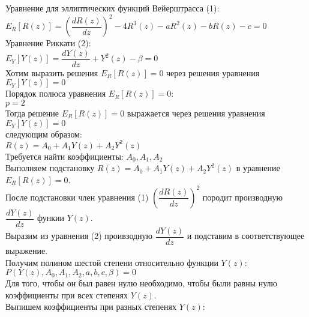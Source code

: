 \documentclass[12pt,a4paper,draft]{letter}
\begin{document}
\onehalfspacing
Уравнение для эллиптических функций Вейерштрасса (1):
\\
$E_R [R(z)] = \left(\dfrac{dR(z)}{dz}\right)^2 - 4R^3(z) - aR^2(z) - bR(z) - c = 0$
\\
Уравнение Риккати (2):
\\
$E_Y [Y(z)] = \dfrac{dY(z)}{dz} + Y^2(z) - \beta = 0$
\\
Хотим выразить решения $E_R [R(z)] = 0$ через решения уравнения $E_Y [Y(z)] = 0$
\\
Порядок полюса уравнения $E_R [R(z)] = 0$:
\\
$p = 2$
\\
Тогда решение $E_R [R(z)] = 0$ выражается через решения уравнения $E_Y [Y(z)] = 0$
\\
следующим образом:
\\
$R(z) = A_0 + A_1 Y(z) + A_2 Y^2(z)$
\\
Требуется найти коэффициенты: $A_0, A_1, A_2$
\\
Выполняем подстановку $R(z) = A_0 + A_1 Y(z) + A_2 Y^2(z)$ в уравнение $E_R [R(z)] = 0$.
\\
После подстановки член уравнения (1) $\left(\dfrac{dR(z)}{dz}\right)^2$ породит производную $ \dfrac{dY(z)}{dz}$ функии $Y(z)$.
\\
Выразим из уравнения (2) проивзодную $ \dfrac{dY(z)}{dz}$ и подставим в соответствующее выражение.
\\
Получим полином шестой степени относительно функции $Y(z)$:
\\
$P(Y(z), A_0, A_1, A_2, a, b, c, \beta) = 0$
\\
Для того, чтобы он был равен нулю необходимо, чтобы были равны нулю коэффициенты при всех степенях $Y(z)$.
\\
Выпишем коэффициенты при разных степенях $Y(z)$:
\\
\end{document}
